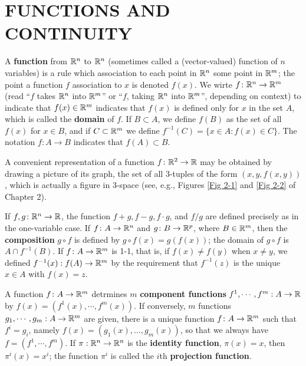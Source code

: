 \clearpage
\section[\textsc{functions and continuity}]{FUNCTIONS AND CONTINUITY}
A \textbf{function} from $\mathbb{R}^n$ to $\mathbb{R}^n$ (sometimes called a (vector-valued) function of $n$ variables)
is a rule which association to each point in $\mathbb{R}^n$ some point in $\mathbb{R}^m$;
the point a function $f$ association to $x$ is denoted $f(x)$.
We wirte $f\colon{}\mathbb{R}^n\to \mathbb{R}^m$ (read ``$f$ takes $\mathbb{R}^n$ into $\mathbb{R}^m$'' or ``$f$, taking
$\mathbb{R}^n$ into $\mathbb{R}^m$'', depending on context) to indicate that $f(x)\in \mathbb{R}^m$ 
indicates that $f(x)$ is defined only for $x$ in the set $A$, which is called the \textbf{domain}
of $f$. If $B\subset A$, we define $f(B)$ as the set of all $f(x)$ for $x\in B$, and if $C\subset \mathbb{R}^m$
we define $f^{-1}(C) = \{x\in A:f(x)\in C\}$. 
The notation $f\colon{}A\to B$ indicates that $f(A)\subset B$.

A convenient representation of a function $f\colon{} \mathbb{R}^2 \to \mathbb{R}$ may
be obtained by drawing a picture of its graph, the set of all
3-tuples of the form $(x,y,f(x,y))$, which is actually a figure in
3-space (see, e.g., Figures \ref{Fig 2-1} and \ref{Fig 2-2} of Chapter 2).

If $f, g\colon{}\mathbb{R}^n \to \mathbb{R}$, the function $f+g, f-g, f\cdot g$, and $f/g$ are defined 
precisely as in the one-variable case. If $f\colon{}A\to \mathbb{R}^n$ and $g\colon{}B\to \mathbb{R}^p$, where 
$B\in \mathbb{R}^m$, then the \textbf{composition} $g\circ f$ is defined by $g\circ f(x)=g(f(x))$;
the domain of $g\circ f$ is $A\cap f^{-1}(B)$. If $f\colon{}A\to \mathbb{R}^m$ is 1-1, that is, if 
$f(x)\neq f(y)$ when $x\neq y$, we defined $f^{-1}(x):f(A)\to \mathbb{R}^m$ by the requirement 
that $f^{-1}(z)$ is the unique $x\in A$ with $f(x) = z$.

A function $f\colon{}A\to \mathbb{R}^m$ detrmines $m$ \textbf{component functions} $f^1, \cdots, f^m:A\to \mathbb{R}$
by $f(x) = \left(f^1(x), \cdots, f^m(x)\right)$. If conversely, $m$ functions $g_1, \cdots, g_m:A\to \mathbb{R}^m$
are given, there is a unique function $f\colon{}A\to \mathbb{R}^m$ such that $f^i = g_i$, 
namely $f(x) = \left(g_1(x), \dots, g_m(x)\right)$, so that we always have $f=\left(f^1, \cdots, f^m\right)$.
If $\pi: \mathbb{R}^n\to \mathbb{R}^n$ is the \textbf{identity function}, 
$\pi(x) = x$, then $\pi^i(x) = x^i$; the function $\pi^i$ is called the $i$th \textbf{projection function}.

